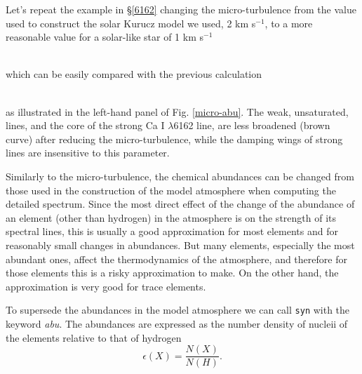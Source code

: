 \documentclass[]{article}
\begin{document}
Let's repeat the example in \S \ref{6162} changing the micro-turbulence from the value used to construct the solar Kurucz model we used, 2 km s$^{-1}$, to a more reasonable value for a solar-like star of 1 km s$^{-1}$
\\
\\

\noindent which can be easily compared with the previous calculation 
\\
\\

\noindent as illustrated in the left-hand panel of Fig. \ref{micro-abu}. The weak, unsaturated, lines, and the core of the strong Ca I $\lambda$6162 line, are less broadened (brown curve) after reducing the micro-turbulence, while the damping wings of strong lines are insensitive to this parameter.

Similarly to the micro-turbulence, the chemical abundances can be changed from those used in the construction of the model atmosphere when computing the detailed spectrum. Since the most direct effect of the change of the abundance of an element (other than hydrogen) in the atmosphere is on the strength of its spectral lines, this is usually a good approximation for most elements and for reasonably small changes in abundances. But many elements, especially the most abundant ones, affect the thermodynamics of the atmosphere, and therefore for those elements this is a risky approximation to make. On the other hand, the approximation is very good for trace elements.

To supersede the abundances in the model atmosphere we can call {\tt syn} with the keyword {\it abu}. The abundances are expressed as the number density of nucleii of the elements relative to that of hydrogen
\begin{equation}
\epsilon (X) = \frac{N(X)}{N(H)}.
\end{equation}
\end{document}

